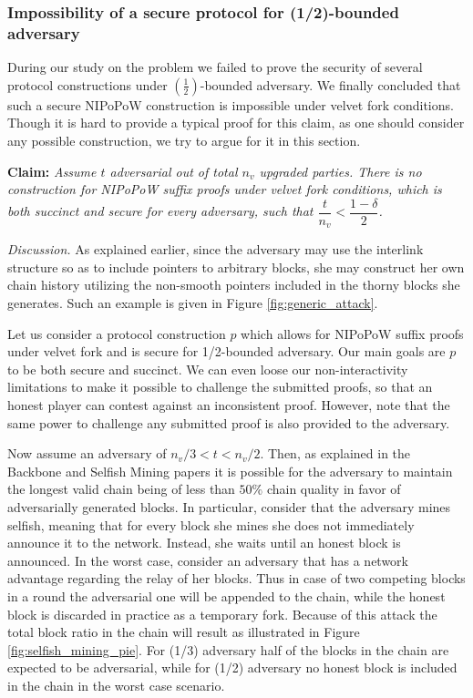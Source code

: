 \subsubsection{Impossibility of a secure protocol for (1/2)-bounded adversary}
During our study on the problem we failed to prove the security of several protocol
constructions under $(\frac{1}{2})$-bounded adversary. We finally concluded that
such a secure NIPoPoW construction is impossible under velvet fork conditions.
Though it is hard to provide a typical proof for this claim, as one should consider
any possible construction, we try to argue for it in this section.

\textbf{Claim:} \textit{Assume $t$ adversarial out of total $n_v$ upgraded parties.
There is no construction for NIPoPoW suffix proofs under velvet fork conditions,
which is both succinct and secure for every adversary, such that
$\dfrac{t}{n_v} < \dfrac{1 - \delta}{2} $.}

\textit{Discussion.} As explained earlier, since the adversary may use the interlink
structure so as to include pointers to arbitrary blocks,  she may construct her own
chain history utilizing the non-smooth pointers included in the thorny blocks she
generates. Such an example is given in Figure \ref{fig:generic_attack}.

Let us consider a protocol construction $p$ which allows for NIPoPoW suffix proofs
under velvet fork and is secure for 1/2-bounded adversary. Our main
goals are $p$ to be both secure and succinct. We can even loose our non-interactivity
limitations to make it possible to challenge the submitted proofs, so that an honest
player can contest against an inconsistent proof. However, note that the same power
to challenge any submitted proof is also provided to the adversary.

Now assume an adversary of $ n_v/3 < t < n_v/2 $. Then, as explained
in the Backbone and Selfish Mining papers \cite{Backbone}\cite{selfish_mining} it
is possible for the adversary to maintain the longest valid chain being of less
than $50\%$ chain quality in favor of adversarially generated blocks. In particular,
consider that the adversary mines selfish, meaning that for every block she mines
she does not immediately announce it to the network. Instead, she waits until an
honest block is announced. In the worst case, consider an adversary that has a
network advantage regarding the relay of her blocks. Thus in case of two competing
blocks in a round the adversarial one will be appended to the chain, while the
honest block is discarded in practice as a temporary fork. Because of this attack
the total block ratio in the chain will result as illustrated in Figure
\ref{fig:selfish_mining_pie}. For (1/3) adversary half of the blocks in the
chain are expected to be adversarial, while for (1/2) adversary no honest block
is included in the chain in the worst case scenario.

